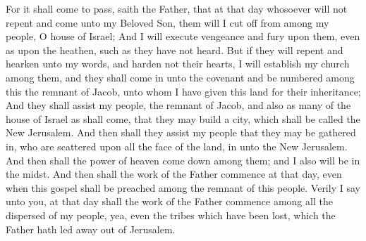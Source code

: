 For it shall come to pass, saith the Father, that at that day whosoever will not repent and come unto my Beloved Son, them will I cut off from among my people, O house of Israel;
\bverse \iffalse And I will execute vengeance and fury upon them, even as upon the heathen, such as they have not heard. \fi
And I will execute vengeance and fury upon them, even as upon the heathen, such as they have not heard.
\bverse \iffalse But if they will repent and hearken unto my words, and harden not their hearts, I will establish my church among them, and they shall come in unto the covenant and be numbered among this the remnant of Jacob, unto whom I have given this land for their inheritance; \fi
But if they will repent and hearken unto my words, and harden not their hearts, I will establish my church among them, and they shall come in unto the covenant and be numbered among this the remnant of Jacob, unto whom I have given this land for their inheritance;
\bverse \iffalse And they shall assist my people, the remnant of Jacob, and also as many of the house of Israel as shall come, that they may build a city, which shall be called the New Jerusalem. \fi
And they shall assist my people, the remnant of Jacob, and also as many of the house of Israel as shall come, that they may build a city, which shall be called the New Jerusalem.
\bverse \iffalse And then shall they assist my people that they may be gathered in, who are scattered upon all the face of the land, in unto the New Jerusalem. \fi
And then shall they assist my people that they may be gathered in, who are scattered upon all the face of the land, in unto the New Jerusalem.
\bverse \iffalse And then shall the power of heaven come down among them; and I also will be in the midst. \fi
And then shall the power of heaven come down among them; and I also will be in the midst.
\bverse \iffalse And then shall the work of the Father commence at that day, even when this gospel shall be preached among the remnant of this people. Verily I say unto you, at that day shall the work of the Father commence among all the dispersed of my people, yea, even the tribes which have been lost, which the Father hath led away out of Jerusalem. \fi
And then shall the work of the Father commence at that day, even when this gospel shall be preached among the remnant of this people. Verily I say unto you, at that day shall the work of the Father commence among all the dispersed of my people, yea, even the tribes which have been lost, which the Father hath led away out of Jerusalem.
